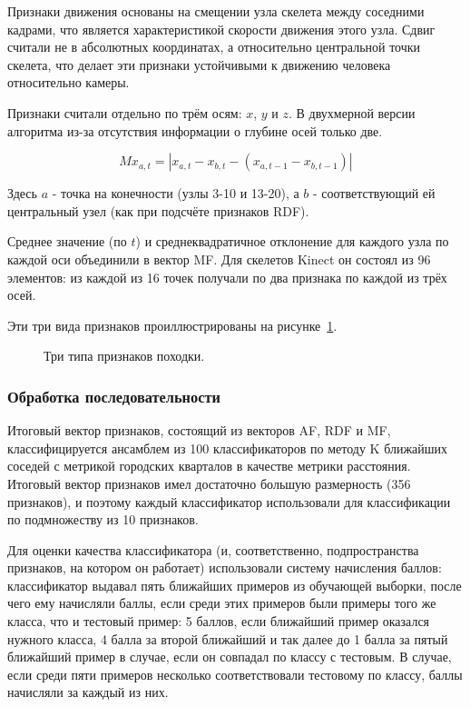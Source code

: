 \documentclass[a4paper,twoside,11pt]{article}
\numberwithin{equation}{section}
\begin{document}
Признаки движения основаны на смещении узла скелета между соседними кадрами, что является характеристикой скорости движения этого узла. Сдвиг считали не в абсолютных координатах, а относительно центральной точки скелета, что делает эти признаки устойчивыми к движению человека относительно камеры.

Признаки считали отдельно по трём осям: $x$, $y$ и $z$. В двухмерной версии алгоритма из-за отсутствия информации о глубине осей только две.

$$Mx_{a,t} = |x_{a, t} - x_{b, t} - (x_{a, t-1} - x_{b, t-1})|$$

Здесь $a$ - точка на конечности (узлы 3-10 и 13-20), а $b$ - соответствующий ей центральный узел (как при подсчёте признаков RDF).

Среднее значение (по $t$) и среднеквадратичное отклонение для каждого узла по каждой оси объединили в вектор MF. Для скелетов Kinect он состоял из 96 элементов: из каждой из 16 точек получали по два признака по каждой из трёх осей.

Эти три вида признаков проиллюстрированы на рисунке~\ref{threetypes}.

\begin{figure}[ht]
    \caption{Три типа признаков походки.}
    \label{threetypes}
\end{figure}

\subsubsection{Обработка последовательности}

Итоговый вектор признаков, состоящий из векторов AF, RDF и MF, классифицируется ансамблем из 100 классификаторов по методу K ближайших соседей с метрикой городских кварталов в качестве метрики расстояния. Итоговый вектор признаков имел достаточно большую размерность (356 признаков), и поэтому каждый классификатор использовали для классификации по подмножеству из 10 признаков.

Для оценки качества классификатора (и, соответственно, подпространства признаков, на котором он работает) использовали систему начисления баллов: классификатор выдавал пять ближайших примеров из обучающей выборки, после чего ему начисляли баллы, если среди этих примеров были примеры того же класса, что и тестовый пример: 5 баллов, если ближайший пример оказался нужного класса, 4 балла за второй ближайший и так далее до 1 балла за пятый ближайший пример в случае, если он совпадал по классу с тестовым. В случае, если среди пяти примеров несколько соответствовали тестовому по классу, баллы начисляли за каждый из них.
\end{document}
